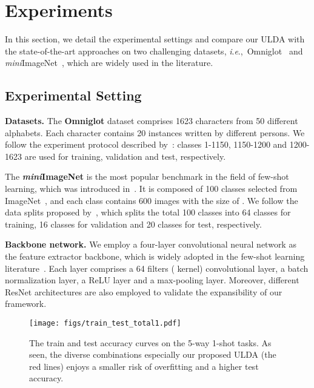 \documentclass[letterpaper]{article} \usepackage{aaai21}  \usepackage{times}  \usepackage{helvet} \usepackage{courier}  \usepackage[hyphens]{url}  \usepackage{graphicx} \urlstyle{rm} \def\UrlFont{\rm}  \usepackage{natbib}  \usepackage{caption} \usepackage{url}
\newcommand{\ie}{\textit{i}.\textit{e}.,}
\begin{document}
\section{Experiments}
\label{sec:experiments}

In this section, we detail the experimental settings and compare our ULDA with the state-of-the-art approaches on two challenging datasets, \ie~Omniglot~\cite{lake2011one} and \emph{mini}ImageNet~\cite{Vinyals2016NIPS}, which are widely used in the literature.


\subsection{Experimental Setting}
\noindent\textbf{Datasets.} 
The \textbf{Omniglot} dataset comprises 1623 characters from 50 different alphabets. Each character contains 20 instances written by different persons. We follow the experiment protocol described by~\cite{AAL2019ICML}: classes 1-1150, 1150-1200 and 1200-1623 are used for training, validation and test, respectively.

The \textbf{\emph{mini}ImageNet} is the most popular benchmark in the field of few-shot learning, which was introduced in~\cite{Vinyals2016NIPS}. It is composed of 100 classes selected from ImageNet~\cite{Alex2012NIPS}, and each class contains 600 images with the size of . We follow the data splits proposed by~\cite{RaviICLR2017}, which splits the total 100 classes into 64 classes for training, 16 classes for validation and 20 classes for test, respectively. 


\noindent\textbf{Backbone network.}
We employ a four-layer convolutional neural network as the feature extractor backbone, which is widely adopted in the few-shot learning literature~\cite{Snell2016NIPS,FinnICML2017}. Each layer comprises a 64 filters ( kernel) convolutional layer, a batch normalization layer, a ReLU layer and a  max-pooling layer. Moreover, different ResNet \cite{He2016ResNet} architectures are also employed to validate the expansibility of our framework.

\begin{figure*}[!tbp]
\begin{center}
  \texttt{[image: figs/train\_test\_total1.pdf]}
\end{center}
\vspace{-0.3cm}
  \caption{The train and test accuracy curves on the 5-way 1-shot tasks. As seen, the diverse combinations especially our proposed ULDA (the red lines) enjoys a smaller risk of overfitting and a higher test accuracy.}
  \label{fig:total_train_test_curves}
\end{figure*}
\end{document}

